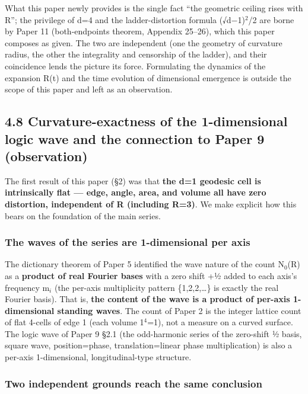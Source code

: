 \documentclass[
]{ltjsarticle}
\begin{document}
What this paper newly provides is the single fact ``the geometric
ceiling rises with R''; the privilege of d=4 and the ladder-distortion
formula (√d−1)\(^{2}\)/2 are borne by Paper 11 (both-endpoints theorem,
Appendix 25--26), which this paper composes as given. The two are
independent (one the geometry of curvature radius, the other the
integrality and censorship of the ladder), and their coincidence lends
the picture its force. Formulating the dynamics of the expansion R(t)
and the time evolution of dimensional emergence is outside the scope of
this paper and left as an observation.

\subsection{4.8 Curvature-exactness of the 1-dimensional logic wave and
the connection to Paper 9
(observation)}\label{curvature-exactness-of-the-1-dimensional-logic-wave-and-the-connection-to-paper-9-observation}

The first result of this paper (§2) was that \textbf{the d=1 geodesic
cell is intrinsically flat --- edge, angle, area, and volume all have
zero distortion, independent of R (including R=3)}. We make explicit how
this bears on the foundation of the main series.

\subsubsection{The waves of the series are 1-dimensional per
axis}\label{the-waves-of-the-series-are-1-dimensional-per-axis}

The dictionary theorem of Paper 5 identified the wave nature of the
count N\(_{0}\)(R) as a \textbf{product of real Fourier bases} with a
zero shift +½ added to each axis's frequency m\(_i\) (the per-axis
multiplicity pattern \{1,2,2,\ldots\} is exactly the real Fourier
basis). That is, \textbf{the content of the wave is a product of
per-axis 1-dimensional standing waves}. The count of Paper 2 is the
integer lattice count of flat 4-cells of edge 1 (each volume
1\(^{4}\)=1), not a measure on a curved surface. The logic wave of Paper
9 §2.1 (the odd-harmonic series of the zero-shift ½ basis, square wave,
position=phase, translation=linear phase multiplication) is also a
per-axis 1-dimensional, longitudinal-type structure.

\subsubsection{Two independent grounds reach the same
conclusion}\label{two-independent-grounds-reach-the-same-conclusion}
\end{document}
